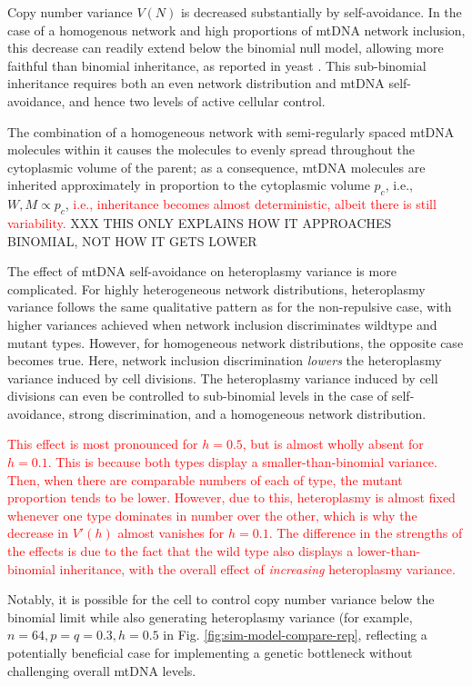 \documentclass{article}
\begin{document}
Copy number variance $V(N)$ is decreased substantially by self-avoidance. In the case of a homogenous network and high proportions of mtDNA network inclusion, this decrease can readily extend below the binomial null model, allowing more faithful than binomial inheritance, as reported in yeast \cite{jajoo2016accurate}. This sub-binomial inheritance requires both an even network distribution and mtDNA self-avoidance, and hence two levels of active cellular control. 

The combination of a homogeneous network with semi-regularly spaced mtDNA molecules within it causes the molecules to evenly spread throughout the cytoplasmic volume of the parent; as a consequence, mtDNA molecules are inherited approximately in proportion to the cytoplasmic volume $p_c$, i.e., $W,M\propto p_c$, \textcolor{red}{i.e., inheritance becomes almost deterministic, albeit there is still variability.} XXX THIS ONLY EXPLAINS HOW IT APPROACHES BINOMIAL, NOT HOW IT GETS LOWER

The effect of mtDNA self-avoidance on heteroplasmy variance is more complicated. For highly heterogeneous network distributions, heteroplasmy variance follows the same qualitative pattern as for the non-repulsive case, with higher variances achieved when network inclusion discriminates wildtype and mutant types. However, for homogeneous network distributions, the opposite case becomes true. Here, network inclusion discrimination \emph{lowers} the heteroplasmy variance induced by cell divisions. The heteroplasmy variance induced by cell divisions can even be controlled to sub-binomial levels in the case of self-avoidance, strong discrimination, and a homogeneous network distribution.

\textcolor{red}{This effect is most pronounced for $h=0.5$, but is almost wholly absent for $h=0.1$. This is because both types display a smaller-than-binomial variance. Then, when there are comparable numbers of each of type, the mutant proportion tends to be lower. However, due to this, heteroplasmy is almost fixed whenever one type dominates in number over the other, which is why the decrease in $V'(h)$ almost vanishes for $h=0.1$. The difference in the strengths of the effects is due to the fact that the wild type also displays a lower-than-binomial inheritance, with the overall effect of \textit{increasing} heteroplasmy variance.}

Notably, it is possible for the cell to control copy number variance below the binomial limit while also generating heteroplasmy variance (for example, $n = 64, p = q = 0.3, h = 0.5$ in Fig. \ref{fig:sim-model-compare-rep}, reflecting a potentially beneficial case for implementing a genetic bottleneck without challenging overall mtDNA levels.
\end{document}
